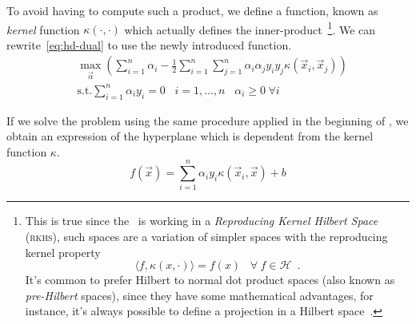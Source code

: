 To avoid having to compute such a product, we define a function, known as \emph{kernel} function
$\kappa(\cdot, \cdot)$ which actually defines the inner-product~\footnote{
	This is true since the \svm\ is working in a \emph{Reproducing Kernel Hilbert Space}
	(\textsc{rkhs}), such spaces are a variation of simpler spaces with the reproducing kernel
	property
	\[\langle{f, \kappa(x, \cdot)}\rangle = f(x) \hspace{10pt} \forall\hspace{3pt}f \in
	\mathcal{H} \enspace.\]
	It's common to prefer Hilbert to normal dot product spaces (also known as
	\emph{pre-Hilbert} spaces), since they have some mathematical advantages, for instance, it's
	always possible to define a projection in a Hilbert space~\cite{learning-with-kernels}.
}.
We can rewrite~\ref{eq:hd-dual} to use the newly introduced function. 
\begin{equation}
	\label{eq:hd-dual-kf}
	\begin{aligned}
		 & \max_{\vec{\alpha}}\left(\sum_{i = 1}^n{\alpha_i} - \frac{1}{2}\sum_{i =
		1}^n\sum_{j = 1}^n{\alpha_i\alpha_j y_i y_j \kappa(\vec{x}_i, \vec{x}_j)}\right) \\
		 & \text{s.t.} \sum_{i = 1}^n{\alpha_i y_i} = 0 \hspace{10pt} i = 1, \ldots, n
		 \hspace{10pt} \alpha_i \geq 0 \hspace{3pt} \forall i
	\end{aligned}
\end{equation}

If we solve the problem using the same procedure applied in the beginning of , we obtain
an expression of the hyperplane which is dependent from the kernel function $\kappa$.
\begin{equation}
	\label{eq:hd-of}
	f(\vec{x}) = \sum_{i = 1}^n\alpha_iy_i\kappa(\vec{x}_i, \vec{x}) + b
\end{equation}

